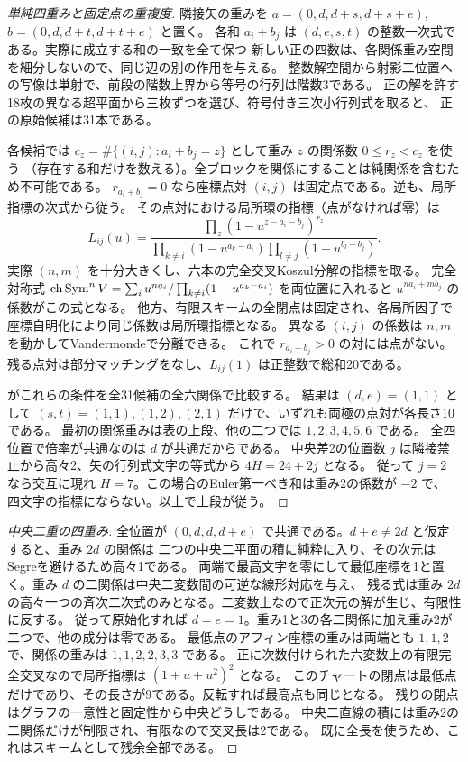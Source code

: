 \begin{proof}[単純四重みと固定点の重複度]
隣接矢の重みを $a=(0,d,d+s,d+s+e)$, $b=(0,d,d+t,d+t+e)$ と置く。
各和 $a_i+b_j$ は $(d,e,s,t)$ の整数一次式である。実際に成立する和の一致を全て保つ
新しい正の四数は、各関係重み空間を細分しないので、同じ辺の別の作用を与える。
整数解空間から射影二位置への写像は単射で、前段の階数上界から等号の行列は階数3である。
正の解を許す18枚の異なる超平面から三枚ずつを選び、符号付き三次小行列式を取ると、
正の原始候補は31本である。

各候補では $c_z=\#\{(i,j):a_i+b_j=z\}$ として重み $z$ の関係数 $0\le r_z<c_z$ を使う
（存在する和だけを数える）。全ブロックを関係にすることは純関係を含むため不可能である。
$r_{a_i+b_j}=0$ なら座標点対 $(i,j)$ は固定点である。逆も、局所指標の次式から従う。
その点対における局所環の指標（点がなければ零）は
\[
 L_{ij}(u)=
 \frac{\prod_z(1-u^{z-a_i-b_j})^{r_z}}
 {\prod_{k\ne i}(1-u^{a_k-a_i})\prod_{l\ne j}(1-u^{b_l-b_j})}.
\]
実際 $(n,m)$ を十分大きくし、六本の完全交叉Koszul分解の指標を取る。
完全対称式 $\operatorname{ch}\operatorname{Sym}^n V=\sum_i u^{n a_i}/\prod_{k\ne i}(1-u^{a_k-a_i})$
を両位置に入れると $u^{na_i+mb_j}$ の係数がこの式となる。
他方、有限スキームの全閉点は固定され、各局所因子で座標自明化により同じ係数は局所環指標となる。
異なる $(i,j)$ の係数は $n,m$ を動かしてVandermondeで分離できる。
これで $r_{a_i+b_j}>0$ の対には点がない。残る点対は部分マッチングをなし、$L_{ij}(1)$ は正整数で総和20である。

 がこれらの条件を全31候補の全六関係で比較する。
結果は $(d,e)=(1,1)$ として $(s,t)=(1,1),(1,2),(2,1)$ だけで、いずれも両極の点対が各長さ10である。
最初の関係重みは表の上段、他の二つでは $1,2,3,4,5,6$ である。
全四位置で倍率が共通なのは $d$ が共通だからである。
中央差2の位置数 $j$ は隣接禁止から高々2、矢の行列式文字の等式から $4H=24+2j$ となる。
従って $j=2$ なら交互に現れ $H=7$。この場合のEuler第一べき和は重み2の係数が $-2$ で、
四文字の指標にならない。以上で上段が従う。
\end{proof}

\begin{proof}[中央二重の四重み]
全位置が $(0,d,d,d+e)$ で共通である。$d+e\ne2d$ と仮定すると、重み $2d$ の関係は
二つの中央二平面の積に純粋に入り、その次元はSegreを避けるため高々1である。
両端で最高文字を零にして最低座標を1と置く。重み $d$ の二関係は中央二変数間の可逆な線形対応を与え、
残る式は重み $2d$ の高々一つの斉次二次式のみとなる。二変数上なので正次元の解が生じ、有限性に反する。
従って原始化すれば $d=e=1$。重み1と3の各二関係に加え重み2が二つで、他の成分は零である。
最低点のアフィン座標の重みは両端とも $1,1,2$ で、関係の重みは $1,1,2,2,3,3$ である。
正に次数付けられた六変数上の有限完全交叉なので局所指標は $(1+u+u^2)^2$ となる。
このチャートの閉点は最低点だけであり、その長さが9である。反転すれば最高点も同じとなる。
残りの閉点はグラフの一意性と固定性から中央どうしである。
中央二直線の積には重み2の二関係だけが制限され、有限なので交叉長は2である。
既に全長を使うため、これはスキームとして残余全部である。
\end{proof}
